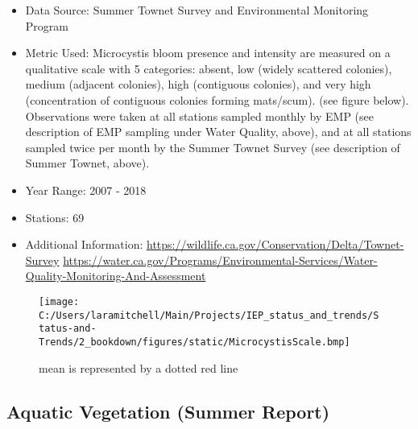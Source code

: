 \documentclass[
]{book}
\providecommand{\tightlist}{%
  \setlength{\itemsep}{0pt}\setlength{\parskip}{0pt}}
\begin{document}
\begin{itemize}
\tightlist
\item
  Data Source: Summer Townet Survey and Environmental Monitoring Program
\item
  Metric Used: Microcystis bloom presence and intensity are measured on a qualitative scale with 5 categories: absent, low (widely scattered colonies), medium (adjacent colonies), high (contiguous colonies), and very high (concentration of contiguous colonies forming mats/scum). (see figure below). Observations were taken at all stations sampled monthly by EMP (see description of EMP sampling under Water Quality, above), and at all stations sampled twice per month by the Summer Townet Survey (see description of Summer Townet, above).
\item
  Year Range: 2007 - 2018
\item
  Stations: 69
\item
  Additional Information: \url{https://wildlife.ca.gov/Conservation/Delta/Townet-Survey} \url{https://water.ca.gov/Programs/Environmental-Services/Water-Quality-Monitoring-And-Assessment}
\end{itemize}

\begin{figure}
\centering
\texttt{[image: C:/Users/laramitchell/Main/Projects/IEP\_status\_and\_trends/Status-and-Trends/2\_bookdown/figures/static/MicrocystisScale.bmp]}
\caption{\label{fig:unnamed-chunk-187}mean is represented by a dotted red line}
\end{figure}

\hypertarget{aquatic-vegetation-summer-report}{%
\subsection{Aquatic Vegetation (Summer Report)}\label{aquatic-vegetation-summer-report}}
\end{document}
